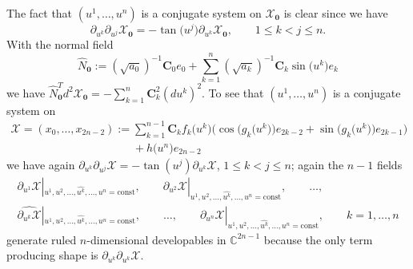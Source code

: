\documentclass[11pt]{article}
\begin{document}
The fact that $(u^1,\dots ,u^n)$ is a conjugate system on
$\mathcal{X}_{\mathbf{0}}$ is clear since we have
\[
\partial_{u^k}\partial_{u^j}\mathcal{X}_\mathbf{0}=
-\tan\big(u^j\big)\partial_{u^k}\mathcal{X}_\mathbf{0},\qquad 1\le k<j\le n.
\]
With the normal f\/ield
\[
\hat
N_{\mathbf{0}}:=(\sqrt{a_0})^{-1}\mathbf{C}_0e_0+
\sum_{k=1}^n(\sqrt{a_k})^{-1}\mathbf{C}_k\sin\big(u^k\big)e_k
\]
we have $\hat
N_{\mathbf{0}}^Td^2\mathcal{X}_{\mathbf{0}}=-\sum\limits_{k=1}^n\mathbf{C}_k^2(du^k)^2$.
To see that $(u^1,\dots ,u^n)$ is a conjugate system on
\begin{gather*}
\mathcal{X}=(x_0,\dots ,x_{2n-2}):=\sum_{k=1}^{n-1}\mathbf{C}_kf_k\big(u^k\big)\big(\cos\big(g_k\big(u^k\big)\big)e_{2k-2}
+\sin\big(g_k\big(u^k\big)\big)e_{2k-1}\big)\\
\phantom{\mathcal{X}=(x_0,\dots ,x_{2n-2}):=}{} +h\big(u^n\big)e_{2n-2}
\end{gather*}
we have again
$\partial_{u^k}\partial_{u^j}\mathcal{X}=-\tan(u^j)\partial_{u^k}\mathcal{X}$, $1\le k<j\le n$; again the $n-1$ f\/ields
\begin{gather*}
\partial_{u^1}\mathcal{X}|_{u^1,u^2,\dots ,\widehat{u^k},\dots ,u^n=\mathrm{const}},\qquad
\partial_{u^2}\mathcal{X}|_{u^1,u^2,\dots ,\widehat{u^k},\dots ,u^n=\mathrm{const}},\qquad
\dots ,\\
\widehat{\partial_{u^k}\mathcal{X}}|_{u^1,u^2,\dots ,\widehat{u^k},\dots ,u^n=\mathrm{const}},\qquad
\dots ,
\qquad
\partial_{u^n}\mathcal{X}|_{u^1,u^2,\dots ,\widehat{u^k},\dots ,u^n=\mathrm{const}},\qquad
k=1,\dots ,n
\end{gather*}
generate ruled $n$-dimensional developables in $\mathbb{C}^{2n-1}$
because the only term producing shape is
$\partial_{u^k}\partial_{u^k}\mathcal{X}$.
\end{document}
